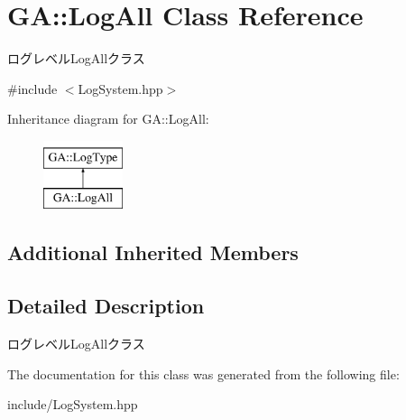 \hypertarget{class_g_a_1_1_log_all}{}\section{GA\+::Log\+All Class Reference}
\label{class_g_a_1_1_log_all}


ログレベル\+Log\+Allクラス  




{\ttfamily \#include $<$Log\+System.\+hpp$>$}

Inheritance diagram for GA\+::Log\+All\+:\begin{figure}[H]
\begin{center}
\leavevmode
\includegraphics[height=2.000000cm]{class_g_a_1_1_log_all}
\end{center}
\end{figure}
\subsection*{Additional Inherited Members}


\subsection{Detailed Description}
ログレベル\+Log\+Allクラス 



The documentation for this class was generated from the following file\+:\begin{DoxyCompactItemize}
\item 
include/Log\+System.\+hpp\end{DoxyCompactItemize}
